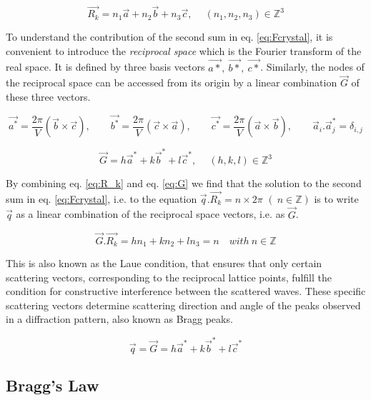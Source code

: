 \begin{equation}
    \label{eq:R_k}
    \vec{R_k}=n_1\vec{a} + n_2\vec{b} + n_3\vec{c}, \quad \ (n_1,n_2,n_3) \in \mathbb{Z}^3
\end{equation}

To understand the contribution of the second sum in eq. \ref{eq:Fcrystal}, it is convenient to introduce the \textit{reciprocal space} which is the Fourier transform of the real space.
It is defined by three basis vectors $\vec{a*},\ \vec{b*},\ \vec{c*}$.
Similarly, the nodes of the reciprocal space can be accessed from its origin by a linear combination $\vec{G}$ of these three vectors.

\begin{equation}
    \vec{a^*}=\frac{2\pi}{V}(\vec{b}\times \vec{c}), \qquad
    \vec{b^*}=\frac{2\pi}{V}(\vec{c}\times \vec{a}), \qquad
    \vec{c^*}=\frac{2\pi}{V}(\vec{a}\times \vec{b}), \qquad
    \vec{a}_i . \vec{a}_j^* = \delta_{i,j}
\end{equation}

\begin{equation}
    \label{eq:G}
    \vec{G}=h\vec{a}^* + k\vec{b}^* + l\vec{c}^*, \quad \ (h,k,l) \in \mathbb{Z}^3
\end{equation}

By combining eq. \ref{eq:R_k} and eq. \ref{eq:G} we find that the solution to the second sum in eq. \ref{eq:Fcrystal}, i.e. to the equation $\vec{q}.\vec{R_k} = n \times 2\pi$ $(\ n \in \mathbb{Z})$ is to write $\vec{q}$ as a linear combination of the reciprocal space vectors, i.e. as $\vec{G}$.

\begin{equation}
    \label{eq:LaueCond}
    \vec{G} . \vec{R_k} = hn_1 + kn_2 + ln_3 = n \quad  with \ n \in \mathbb{Z}
\end{equation}

This is also known as the Laue condition, that ensures that only certain scattering vectors, corresponding to the reciprocal lattice points, fulfill the condition for constructive interference between the scattered waves.
These specific scattering vectors determine scattering direction and angle of the peaks observed in a diffraction pattern, also known as Bragg peaks.

\begin{equation}
    \vec{q} = \vec{G}  = h\vec{a}^* + k\vec{b}^* + l\vec{c}^*
\end{equation}

\subsection{Bragg's Law}

